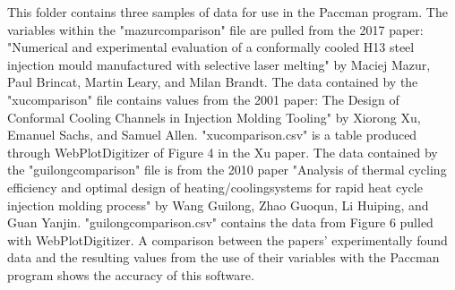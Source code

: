 \documentclass[a4paper,12pt]{article}
\begin{document}
\setlength{\parindent}{0em}
\doublespacing
\captionsetup{labelformat=empty}

This folder contains three samples of data for use in the Paccman program. The variables within the "mazurcomparison" file are pulled from the 2017 paper: "Numerical and experimental evaluation of a conformally cooled H13 steel injection mould manufactured with selective laser melting" by Maciej Mazur, Paul Brincat, Martin Leary, and Milan Brandt. The data contained by the "xucomparison" file contains values from the 2001 paper: The Design of Conformal Cooling Channels in Injection Molding Tooling" by Xiorong Xu, Emanuel Sachs, and Samuel Allen. "xucomparison.csv" is a table produced through WebPlotDigitizer of Figure 4 in the Xu paper. The data contained by the "guilongcomparison" file is from the 2010 paper "Analysis of thermal cycling efficiency and optimal design of heating/coolingsystems for rapid heat cycle injection molding process" by Wang Guilong, Zhao Guoqun, Li Huiping, and Guan Yanjin. "guilongcomparison.csv" contains the data from Figure 6 pulled with WebPlotDigitizer. A comparison between the papers' experimentally found data and the resulting values from the use of their variables with the Paccman program  shows the accuracy of this software.
\end{document}

